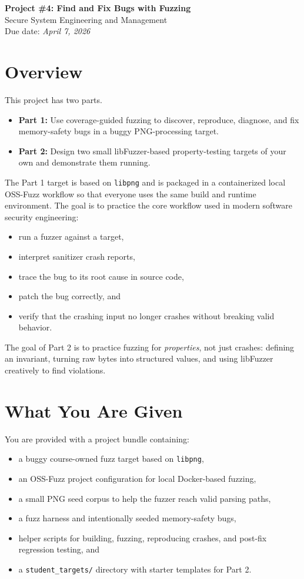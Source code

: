 \documentclass[11pt]{article}
\begin{document}
\begin{center}
    {\LARGE \textbf{Project \#4: Find and Fix Bugs with Fuzzing}}\\[0.4em]
    {\large Secure System Engineering and Management}\\[0.4em]
    Due date: \textit{April 7, 2026}
\end{center}

\section*{Overview}
This project has two parts.

\begin{itemize}
    \item \textbf{Part 1:} Use coverage-guided fuzzing to discover, reproduce, diagnose, and fix memory-safety bugs in a buggy PNG-processing target.
    \item \textbf{Part 2:} Design two small libFuzzer-based property-testing targets of your own and demonstrate them running.
\end{itemize}

The Part 1 target is based on \texttt{libpng} and is packaged in a containerized local OSS-Fuzz workflow so that everyone uses the same build and runtime environment. The goal is to practice the core workflow used in modern software security engineering:
\begin{itemize}
    \item run a fuzzer against a target,
    \item interpret sanitizer crash reports,
    \item trace the bug to its root cause in source code,
    \item patch the bug correctly, and
    \item verify that the crashing input no longer crashes without breaking valid behavior.
\end{itemize}

The goal of Part 2 is to practice fuzzing for \emph{properties}, not just crashes: defining an invariant, turning raw bytes into structured values, and using libFuzzer creatively to find violations.

\section*{What You Are Given}
You are provided with a project bundle containing:
\begin{itemize}
    \item a buggy course-owned fuzz target based on \texttt{libpng},
    \item an OSS-Fuzz project configuration for local Docker-based fuzzing,
    \item a small PNG seed corpus to help the fuzzer reach valid parsing paths,
    \item a fuzz harness and intentionally seeded memory-safety bugs,
    \item helper scripts for building, fuzzing, reproducing crashes, and post-fix regression testing, and
    \item a \texttt{student\_targets/} directory with starter templates for Part 2.
\end{itemize}
\end{document}
